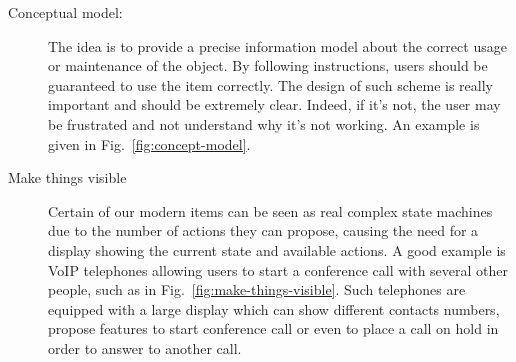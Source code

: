 \documentclass[a4paper,11pt] {article}
\theoremstyle{definition}
\begin{document}
\begin{description}
    \item [Conceptual model:] The idea is to provide a precise information model about the correct usage or maintenance of the object. By following instructions, users should be guaranteed to use the item correctly. The design of such scheme is really important and should be extremely clear. Indeed, if it's not, the user may be frustrated and not understand why it's not working. An example is given in Fig.~\ref{fig:concept-model}.

    \item [Make things visible] Certain of our modern items can be seen as real complex state machines due to the number of actions they can propose, causing the need for a display showing the current state and available actions. A good example is VoIP telephones allowing users to start a conference call with several other people, such as in Fig.~\ref{fig:make-things-visible}. Such telephones are equipped with a large display which can show different contacts numbers, propose features to start conference call or even to place a call on hold in order to answer to another call.
\end{description}
\end{document}
